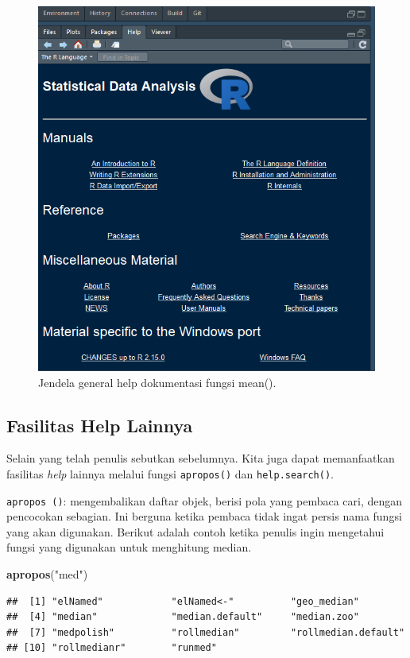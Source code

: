 \documentclass[]{book}
\newenvironment{Shaded}{\begin{snugshade}}{\end{snugshade}}
\newcommand{\KeywordTok}[1]{\textcolor[rgb]{0.13,0.29,0.53}{\textbf{#1}}}
\newcommand{\NormalTok}[1]{#1}
\newcommand{\StringTok}[1]{\textcolor[rgb]{0.31,0.60,0.02}{#1}}
\theoremstyle{definition}
\theoremstyle{definition}
\theoremstyle{definition}
\theoremstyle{remark}
\begin{document}
\begin{figure}

{\centering \includegraphics[width=0.5\linewidth]{./images/generalhelp} 

}

\caption{Jendela general help dokumentasi fungsi mean().}\label{fig:generalhelp}
\end{figure}

\hypertarget{othershelp}{%
\subsection{Fasilitas Help Lainnya}\label{othershelp}}

Selain yang telah penulis sebutkan sebelumnya. Kita juga dapat memanfaatkan fasilitas \emph{help} lainnya melalui fungsi \texttt{apropos()} dan \texttt{help.search()}.

\texttt{apropos\ ()}: mengembalikan daftar objek, berisi pola yang pembaca cari, dengan pencocokan sebagian. Ini berguna ketika pembaca tidak ingat persis nama fungsi yang akan digunakan. Berikut adalah contoh ketika penulis ingin mengetahui fungsi yang digunakan untuk menghitung median.

\begin{Shaded}
\begin{Highlighting}[]
\KeywordTok{apropos}\NormalTok{(}\StringTok{"med"}\NormalTok{)}
\end{Highlighting}
\end{Shaded}

\begin{verbatim}
##  [1] "elNamed"            "elNamed<-"          "geo_median"        
##  [4] "median"             "median.default"     "median.zoo"        
##  [7] "medpolish"          "rollmedian"         "rollmedian.default"
## [10] "rollmedianr"        "runmed"
\end{verbatim}
\end{document}
